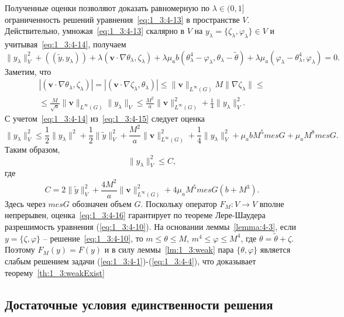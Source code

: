 Полученные оценки позволяют доказать равномерную по $\lambda \in
(0,1]$ ограниченность решений уравнения~\eqref{eq:1_3:4-13} в
пространстве $V$.
Действительно, умножая~\eqref{eq:1_3:4-13} скалярно в
$V$ на $y_{\lambda} = \{\zeta_{\lambda}, \varphi_{\lambda}\} \in V$
и учитывая~\eqref{eq:1_3:4-14}, получаем
\begin{equation}
    \label{eq:1_3:4-15}
    \|y_{\lambda}\|^2_V + ((\widetilde{y}, y_{\lambda})) + \lambda
    (\textbf{v}\cdot \nabla\theta_{\lambda}, \zeta_{\lambda}) +
    \lambda\mu_a b(\theta_{\lambda}^4-\varphi_{\lambda},
    \theta_{\lambda}-\widetilde{\theta}) +\lambda \mu_a
    (\varphi_{\lambda}-\theta_{\lambda}^4, \varphi_{\lambda}) = 0.
\end{equation}
Заметим, что
\begin{gather*}
    |(\textbf{v} \cdot \nabla\theta_{\lambda}, \zeta_{\lambda})|=
    |(\textbf{v} \cdot \nabla\zeta_{\lambda}, \theta_{\lambda})| \leq
    \|\textbf{v}\|_{L^{\infty}(G)} M \|\nabla\zeta_{\lambda}\| \leq \\
    \leq
    \frac{M}{\sqrt{a}}\|\textbf{v}\|_{L^{\infty}(G)}\|y_{\lambda}\|_V
    \leq \frac{M^2}{a}\|\textbf{v}\|^2_{L^{\infty}(G)}
    + \frac{1}{4}\|y_{\lambda}\|^2_V.
\end{gather*}
С учетом~\eqref{eq:1_3:4-14} из~\eqref{eq:1_3:4-15} следует оценка
\[
    \|y_{\lambda}\|^2_V \leq \frac{1}{2} \|y_{\lambda}\|^2 +
    \frac{1}{2} \|\widetilde{y}\|^2_V +
    \frac{M^2}{a}\|\textbf{v}\|^2_{L^{\infty}(G)} +
    \frac{1}{4}\|y_{\lambda}\|^2_V + \mu_a b M^5 mes G + \mu_a M^8 mes
    G.
\]
Таким образом,
\begin{equation}
    \label{eq:1_3:4-16}
    \|y_{\lambda}\|^2_V \leq C,
\end{equation}
где
\[
    C= 2 \|\widetilde{y}\|^2_V +
    \frac{4M^2}{a}\|\textbf{v}\|^2_{L^{\infty}(G)} + 4 \mu_a M^5 mes
    G(b+M^3).
\]
Здесь через $mes G$ обозначен объем $G$.
Поскольку оператор $F_M:
V \to V$ вполне непрерывен, оценка~\eqref{eq:1_3:4-16} гарантирует по
теореме Лере-Шаудера разрешимость уравнения (\ref{eq:1_3:4-10}). На
основании леммы~\ref{lemma:4-3}, если $y=\{\zeta, \varphi\}$ --
решение~\eqref{eq:1_3:4-10}, то $m \leq \theta \leq M$,
$m^4 \leq \varphi \leq M^4$, где $\theta = \widetilde{\theta} + \zeta$.
Поэтому
$F_M(y) = F(y)$ и в силу леммы~\ref{lm:1_3:weak} пара
$\{\theta, \varphi\}$ является слабым решением задачи
(\ref{eq:1_3:4-1})-(\ref{eq:1_3:4-4}),
что доказывает теорему~\ref{th:1_3:weakExist}

\subsection{Достаточные условия единственности решения}
\label{subsec:ch1/sec3/uniqueness}

